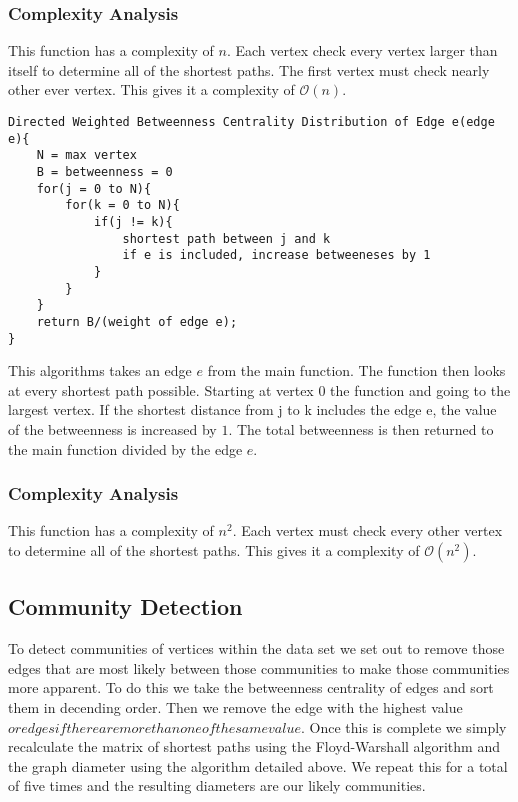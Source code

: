 \documentclass{article}
\begin{document}
\subsubsection{Complexity Analysis}
This function has a complexity of $n$. Each vertex check every vertex larger than itself to determine all of the shortest paths. The first vertex must check nearly other ever vertex. This gives it a complexity of $\mathcal{O}(n)$.

\begin{verbatim}
Directed Weighted Betweenness Centrality Distribution of Edge e(edge e){
    N = max vertex
    B = betweenness = 0
    for(j = 0 to N){
        for(k = 0 to N){
            if(j != k){
                shortest path between j and k
                if e is included, increase betweeneses by 1
            }
        }
    }
    return B/(weight of edge e);
}
\end{verbatim}

This algorithms takes an edge $e$ from the main function. The function then looks at every shortest path possible. Starting at vertex $0$ the function and going to the largest vertex. If the shortest distance from j to k includes the edge e, the value of the betweenness is increased by $1$. The total betweenness is then returned to the main function divided by the edge $e$.

\subsubsection{Complexity Analysis}
This function has a complexity of $n^2$. Each vertex must check every other vertex to determine all of the shortest paths. This gives it a complexity of $\mathcal{O}(n^2)$.

\subsection{Community Detection}
To detect communities of vertices within the data set we set out to remove those edges that are most likely between those communities to make those communities more apparent. To do this we take the betweenness centrality of edges and sort them in decending order. Then we remove the edge with the highest value \(or edges if there are more than one of the same value\). Once this is complete we simply recalculate the matrix of shortest paths using the Floyd-Warshall algorithm and the graph diameter using the algorithm detailed above. We repeat this for a total of five times and the resulting diameters are our likely communities.
\end{document}
